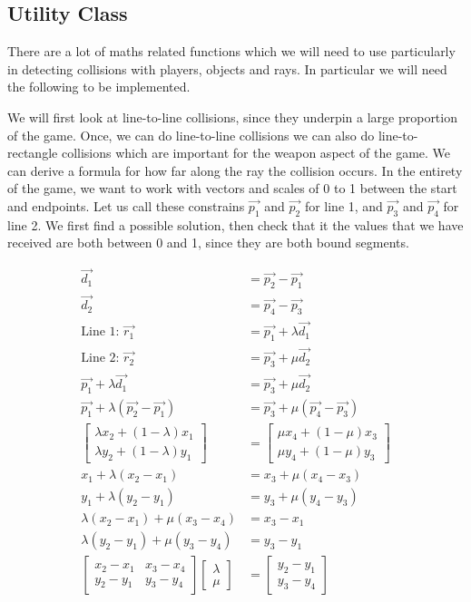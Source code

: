\subsection{Utility Class}

There are a lot of maths related functions which we will need to use particularly in detecting collisions with players, objects and rays. In particular we will need the following to be implemented.

\vs
We will first look at line-to-line collisions, since they underpin a large proportion of the game. Once, we can do line-to-line collisions we can also do line-to-rectangle collisions which are important for the weapon aspect of the game. We can derive a formula for how far along the ray the collision occurs. In the entirety of the game, we want to work with vectors and scales of 0 to 1 between the start and endpoints. Let us call these constrains $\vec{p_1}$ and $\vec{p_2}$ for line 1, and $\vec{p_3}$ and $\vec{p_4}$ for line 2. We first find a possible solution, then check that it the values that we have received are both between 0 and 1, since they are both bound segments.

\vs

\begin{align*}
	\vec{d_1} &= \vec{p_2} - \vec{p_1}\\
	\vec{d_2} &= \vec{p_4} - \vec{p_3}\\
	\text{Line 1: } \vec{r_1} &= \vec{p_1} + \lambda \vec{d_1}\\
	\text{Line 2: } \vec{r_2} &= \vec{p_3} + \mu \vec{d_2}\\
	\vec{p_1} + \lambda \vec{d_1} &= \vec{p_3} + \mu \vec{d_2}\\
	\vec{p_1} + \lambda(\vec{p_2} - \vec{p_1}) &= \vec{p_3} + \mu (\vec{p_4} - \vec{p_3})\\
	\begin{bmatrix} \lambda x_2 + (1 - \lambda)x_1 \\ \lambda y_2 + (1 - \lambda) y_1 \end{bmatrix} &= \begin{bmatrix} \mu x_4 + (1 - \mu)x_3 \\ \mu y_4 + (1 - \mu) y_3 \end{bmatrix}\\
	x_1 + \lambda (x_2 - x_1) &= x_3 + \mu (x_4 - x_3)\\
	y_1 + \lambda (y_2 - y_1) &= y_3 + \mu (y_4 - y_3)\\
	\lambda (x_2 - x_1) + \mu (x_3 - x_4) &= x_3 - x_1\\
	\lambda (y_2 - y_1) + \mu (y_3 - y_4) &= y_3 - y_1\\
    \begin{bmatrix} x_2 - x_1 & x_3 - x_4 \\ y_2 - y_1 & y_3 - y_4 \end{bmatrix} \begin{bmatrix} \lambda \\ \mu \end{bmatrix} &= \begin{bmatrix} y_2 - y_1 \\ y_3 - y_4 \end{bmatrix}\\
\end{align*}

